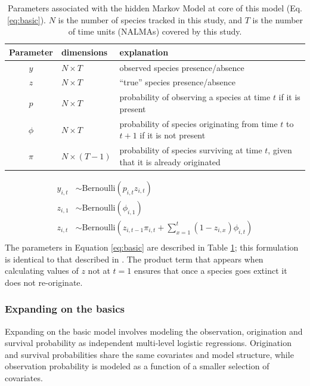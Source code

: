 \documentclass[12pt,letterpaper]{article}
\begin{document}
\begin{table}
  \centering
  \caption{Parameters associated with the hidden Markov Model at core of this model (Eq. \ref{eq:basic}). \(N\) is the number of species tracked in this study, and \(T\) is the number of time units (NALMAs) covered by this study.}
  \begin{tabular}{c l l}
    Parameter & dimensions & explanation \\
    \hline
    \(y\) & \(N \times T\) & observed species presence/absence \\
    \(z\) & \(N \times T\) & ``true'' species presence/absence \\
    \(p\) & \(N \times T\) & probability of observing a species at time \(t\) if it is present \\
    \(\phi\) & \(N \times T\) & probability of species originating from time \(t\) to \(t + 1\) if it is not present \\
    \(\pi\) & \(N \times (T - 1)\) & probability of species surviving at time \(t\), given that it is already originated \\
    \hline
  \end{tabular}
  \label{tab:basic}
\end{table}

\begin{equation}
  \begin{aligned}
    y_{i, t} &\sim \text{Bernoulli}(p_{i, t} z_{i, t}) \\
    z_{i, 1} &\sim \text{Bernoulli}(\phi_{i, 1}) \\
    z_{i, t} &\sim \text{Bernoulli}\left(z_{i, t - 1} \pi_{i,t} + \sum_{x = 1}^{t}(1 - z_{i, x}) \phi_{i,t}\right) \\
  \end{aligned}
  \label{eq:basic}
\end{equation}
The parameters in Equation \ref{eq:basic} are described in Table \ref{tab:basic}; this formulation is identical to that described in \citet{Royle2008}. The product term that appears when calculating values of \(z\) not at \(t = 1\) ensures that once a species goes extinct it does not re-originate. 


\subsubsection*{Expanding on the basics}
Expanding on the basic model involves modeling the observation, origination and survival probability as independent multi-level logistic regressions. Origination and survival probabilities share the same covariates and model structure, while observation probability is modeled as a function of a smaller selection of covariates.
\end{document}

